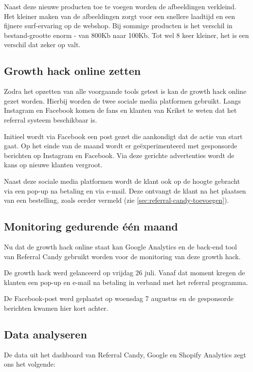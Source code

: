 Naast deze nieuwe producten toe te voegen worden de afbeeldingen verkleind. Het kleiner maken van de afbeeldingen zorgt voor een snellere laadtijd en een fijnere surf-ervaring op de webshop. Bij sommige producten is het verschil in bestand-grootte enorm - van 800Kb naar 100Kb. Tot wel 8 keer kleiner, het is een verschil dat zeker op valt.

\subsection{Growth hack online zetten} \label{sec:growth-hack-online-zetten}
Zodra het opzetten van alle voorgaande tools getest is kan de growth hack online gezet worden. Hierbij worden de twee sociale media platformen gebruikt. Langs Instagram en Facebook komen de fans en klanten van Kriket te weten dat het referral systeem beschikbaar is. 

Initieel wordt via Facebook een post gezet die aankondigt dat de actie van start gaat. Op het einde van de maand wordt er geëxperimenteerd met gesponsorde berichten op Instagram en Facebook. Via deze gerichte advertenties wordt de kans op nieuwe klanten vergroot.

Naast deze sociale media platformen wordt de klant ook op de hoogte gebracht via een pop-up na betaling en via e-mail. Deze ontvangt de klant na het plaatsen van een bestelling, zoals eerder vermeld (zie \ref{sec:referral-candy-toevoegen}). 

\subsection{Monitoring gedurende één maand} \label{sec:monitoring-gedurende-twee-weken}
Nu dat de growth hack online staat kan Google Analytics en de back-end tool van Referral Candy gebruikt worden voor de monitoring van deze growth hack. 

De growth hack werd gelanceerd op vrijdag 26 juli. Vanaf dat moment kregen de klanten een pop-up en e-mail na betaling in verband met het referral programma. 

De Facebook-post werd geplaatst op woensdag 7 augustus en de gesponsorde berichten kwamen hier kort achter.

\subsection{Data analyseren} \label{sec:data-analyseren}
De data uit het dashboard van Referral Candy, Google en Shopify Analytics zegt ons het volgende:

